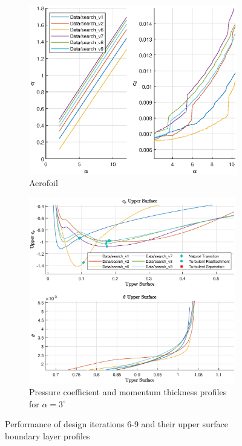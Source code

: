 \documentclass{article}
\begin{document}
\begin{figure}[H]
    \centering
    \begin{subfigure}{0.45\textwidth}
        \centering
        \includegraphics[width=1.2\textwidth, center]{figures/hiRe_lad_9.eps}
        \caption{Aerofoil}
        \label{fig:v9_lad}
    \end{subfigure}
    \begin{subfigure}{0.54\textwidth}
        \centering
        \includegraphics[width=0.99\textwidth]{figures/hiRe_upperprofile_9_a3.eps}
        \caption{Pressure coefficient and momentum thickness profiles for $\alpha = 3^\circ$}
        \label{fig:v9_uprofile}
    \end{subfigure}
    \caption{Performance of design iterations 6-9 and their upper surface boundary layer profiles}
\end{figure}
\end{document}
